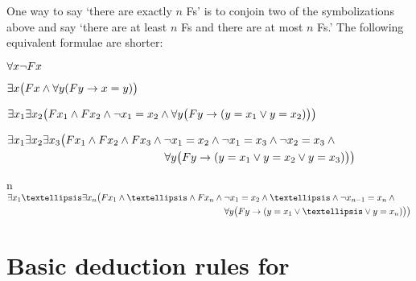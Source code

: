 One way to say `there are exactly $n$ Fs' is to conjoin two of the symbolizations above and say `there are at least $n$ Fs and there are at most $n$ Fs.' The following equivalent formulae are shorter:
\begin{ekey}
\item[\text{zero}] $\forall x\neg Fx$
\item[\text{one}] $\exists x\bigl(Fx \wedge \forall y(Fy \rightarrow x= y) \bigr)$
\item[\text{two}] $\exists x_1\exists x_2\bigl(Fx_1 \wedge Fx_2 \wedge \neg x_1 = x_2 \wedge \forall y\bigl(Fy \rightarrow (y= x_1 \vee y = x_2) \bigr) \bigr)$
\item[\text{three}] $\begin{multlined}[t]
	\exists x_1\exists x_2\exists x_3\bigl( Fx_1 \eand Fx_2 \eand Fx_3 \eand \enot x_1 =  x_2 \eand \enot  x_1 = x_3 \eand \enot x_2 = x_3 \eand \phantom{x} \\
\forall y\bigl( Fy \eif (y = x_1 \eor y = x_2 \eor y =  x_3) \bigr) \bigr)
\end{multlined}$
\item[n] $\begin{multlined}[t]
	\exists x_1…\exists x_n\bigl( Fx_1 \eand …\eand Fx_n  \eand \enot x_1 = x_2 \eand …\eand \enot x_{n-1}= x_n \eand \phantom{x} \\
\forall y\bigl( Fy \eif (y= x_1 \eor … \eor y= x_n) \bigr)\bigr)
\end{multlined}$ 
\end{ekey}

\newpage
\label{ProofRules}
\section*{Basic deduction rules for \TFL}
\renewenvironment{proof}
	{\noindent\par\noindent\small$\begin{nd}}
	{\end{nd}$\noindent\normalsize\ignorespacesafterend}

